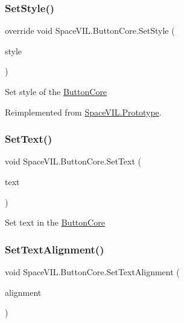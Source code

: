 \subsubsection{\texorpdfstring{Set\+Style()}{SetStyle()}}
{\footnotesize\ttfamily override void Space\+V\+I\+L.\+Button\+Core.\+Set\+Style (\begin{DoxyParamCaption}\item[{\mbox{\hyperlink{class_space_v_i_l_1_1_decorations_1_1_style}{Style}}}]{style }\end{DoxyParamCaption})\hspace{0.3cm}{\ttfamily [virtual]}}



Set style of the \mbox{\hyperlink{class_space_v_i_l_1_1_button_core}{Button\+Core}} 



Reimplemented from \mbox{\hyperlink{class_space_v_i_l_1_1_prototype_ae96644a6ace490afb376fb542161e541}{Space\+V\+I\+L.\+Prototype}}.

\mbox{\label{class_space_v_i_l_1_1_button_core_a86457a942d46d88f4df249da20fabda4}} 
\subsubsection{\texorpdfstring{Set\+Text()}{SetText()}}
{\footnotesize\ttfamily void Space\+V\+I\+L.\+Button\+Core.\+Set\+Text (\begin{DoxyParamCaption}\item[{String}]{text }\end{DoxyParamCaption})}



Set text in the \mbox{\hyperlink{class_space_v_i_l_1_1_button_core}{Button\+Core}} 

\mbox{\label{class_space_v_i_l_1_1_button_core_ae7f849e629f8bd356608066de26f9996}} 
\subsubsection{\texorpdfstring{Set\+Text\+Alignment()}{SetTextAlignment()}}
{\footnotesize\ttfamily void Space\+V\+I\+L.\+Button\+Core.\+Set\+Text\+Alignment (\begin{DoxyParamCaption}\item[{Item\+Alignment}]{alignment }\end{DoxyParamCaption})}



